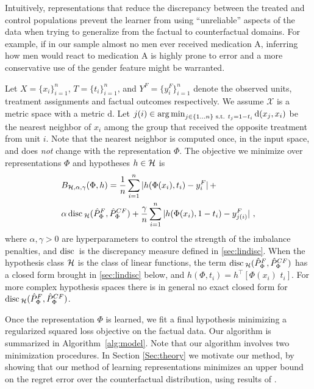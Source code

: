 Intuitively, representations that reduce the discrepancy between the treated and control populations prevent the learner from using ``unreliable'' aspects of the data when trying to generalize from the factual to counterfactual domains. For example, if in our sample almost no men ever received medication A, inferring how men would react to medication A is highly prone to error and a more conservative use of the gender feature might be warranted.

Let $X = \{x_i\}_{i=1}^n$, $T = \{t_i\}_{i=1}^n$, and $Y^F = \{y_i^F\}_{i=1}^n$ denote the observed units, treatment assignments and factual outcomes respectively. We assume $\mathcal{X}$ is a metric space with a metric $\mathrm{d}$. Let $j(i) \in \operatorname*{arg\,min}_{j \in \{1\ldots n\} \text{ s.t. } t_j = 1-t_i} \mathrm{d}(x_j,x_i)$ be the nearest neighbor of $x_i$ among the group that received the opposite treatment from unit $i$. Note that the nearest neighbor is computed once, in the input space, and does \emph{not} change with the representation $\Phi$. The objective we minimize over representations $\Phi$ and hypotheses $h \in \mathcal{H}$ is
\vspace{-2mm}
\begin{align}
& B_{\hypspace, \alpha, \gamma}(\Phi, h) = \frac{1}{n} \sum_{i=1}^n | h(\Phi(x_i),t_i)- y_i^F |\, + \label{eq:modelbound}\\
& \alpha \disc{}_\hypspace(\pF,\pC) +  \frac{\gamma}{n} \sum_{i=1}^n |h(\Phi(x_i),1-t_i)  - y_{j(i)}^F|~,\nonumber
\vspace{-2mm}
\end{align}
where $\alpha, \gamma > 0$ are hyperparameters to control the strength of the imbalance penalties, and $\operatorname*{disc}{}$ is the discrepancy measure defined in \ref{sec:lindisc}.
When the hypothesis class $\mathcal{H}$ is the class of linear functions, the term $\operatorname*{disc}{}_{\mathcal{H}}(\hat{P}_\Phi^{F},\hat{P}_\Phi^{CF})$ has a closed form brought in \ref{sec:lindisc} below, and $h(\Phi,t_i) = h^\top [\Phi(x_i) \, \, t_i]$. For more complex hypothesis spaces there is in general no exact closed form for $\operatorname*{disc}{}_{\mathcal{H}}(\hat{P}_\Phi^{F},\hat{P}_\Phi^{CF})$.

Once the representation $\Phi$ is learned, we fit a final hypothesis minimizing a regularized squared loss objective on the factual data. Our algorithm is summarized in Algorithm~\ref{alg:model}. Note that our algorithm involves two minimization procedures.
In Section \ref{Sec:theory} we motivate our method, by showing that our method of learning representations minimizes an upper bound on the regret error over the counterfactual distribution, using results of \citet{cortes2014domain}.



